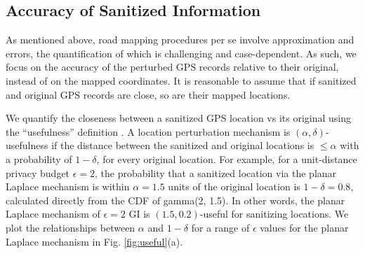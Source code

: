 \documentclass[10pt,journal,compsoc]{IEEEtran}
\begin{document}
\vspace{-6pt}\subsection{Accuracy of Sanitized Information}\label{sec:accuracy}\vspace{-3pt}
As mentioned above, road mapping procedures per se involve approximation and errors, the quantification of which is challenging and case-dependent. As such, we focus on the accuracy of the perturbed GPS records relative to their original, instead of on the mapped coordinates. It is reasonable to assume that if sanitized and original GPS records are close, so are their mapped locations. 

We quantify  the closeness between a  sanitized GPS location vs its original using the ``usefulness'' definition \cite{andres2013geo}. A location perturbation mechanism is $(\alpha, \delta)$-usefulness if the distance between the sanitized  and original locations is $\le\alpha$ with a probability of $1-\delta$, for every original location. For example, for a unit-distance privacy budget $\epsilon=2$, the probability that a sanitized location via the planar Laplace mechanism is within $\alpha=1.5$ units of the original location is $1-\delta=0.8$, calculated directly from the CDF of gamma(2, 1.5). In other words, the planar Laplace mechanism  of $\epsilon=2$ GI is $(1.5,0.2)$-useful for sanitizing locations. We plot the relationships between $\alpha$ and $1-\delta$ for a range of $\epsilon$ values for the planar Laplace mechanism  in Fig. \ref{fig:useful}(a). 
\end{document}
